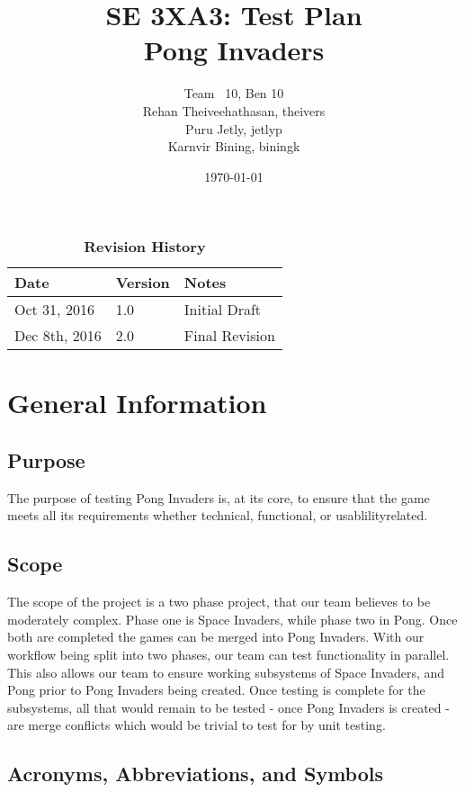 \documentclass[12pt, titlepage]{article}
\title{SE 3XA3: Test Plan\\Pong Invaders}
\author{Team \ 10, Ben 10
		\\ Rehan Theiveehathasan, theivers
		\\ Puru Jetly, jetlyp
		\\ Karnvir Bining, biningk
}
\date{\today}
\begin{document}
\maketitle

\tableofcontents
\listoftables
\listoffigures

\begin{table}[bp]
\caption{\bf Revision History}
\begin{tabularx}{\textwidth}{p{3cm}p{2cm}X}
\toprule {\bf Date} & {\bf Version} & {\bf Notes}\\
\midrule
Oct 31, 2016 & 1.0 &  Initial Draft\\
Dec 8th, 2016 & 2.0 & Final Revision\\
\bottomrule
\end{tabularx}
\end{table}

\newpage


\section{General Information}

\subsection{Purpose}
The purpose of testing Pong Invaders is, at its core, to ensure that
the game meets all its requirements whether technical, functional, or
usablilityrelated.


\subsection{Scope}
The scope of the project is a two phase project, that our team
believes to be moderately complex. Phase one is Space Invaders, while phase two
in Pong. Once both are completed the games can be merged into Pong Invaders.
With our workflow being split into two phases, our team can test functionality
in parallel. This also allows our team to ensure working subsystems of Space
Invaders, and Pong prior to Pong Invaders being created. Once testing is
complete for the subsystems, all that would remain to be tested - once Pong
Invaders is created - are merge conflicts which would be trivial to test for by
unit testing.

\subsection{Acronyms, Abbreviations, and Symbols}
	
\end{document}

